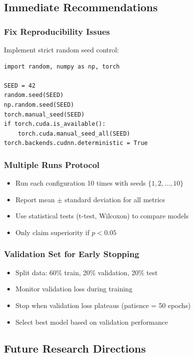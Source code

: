 \documentclass[10pt,a4paper]{article}
\begin{document}
\subsection{Immediate Recommendations}

\subsubsection{Fix Reproducibility Issues}

Implement strict random seed control:

\begin{verbatim}
import random, numpy as np, torch

SEED = 42
random.seed(SEED)
np.random.seed(SEED)
torch.manual_seed(SEED)
if torch.cuda.is_available():
    torch.cuda.manual_seed_all(SEED)
torch.backends.cudnn.deterministic = True
\end{verbatim}

\subsubsection{Multiple Runs Protocol}

\begin{itemize}
\item Run each configuration 10 times with seeds $\{1, 2, \ldots, 10\}$
\item Report mean $\pm$ standard deviation for all metrics
\item Use statistical tests (t-test, Wilcoxon) to compare models
\item Only claim superiority if $p < 0.05$
\end{itemize}

\subsubsection{Validation Set for Early Stopping}

\begin{itemize}
\item Split data: 60\% train, 20\% validation, 20\% test
\item Monitor validation loss during training
\item Stop when validation loss plateaus (patience = 50 epochs)
\item Select best model based on validation performance
\end{itemize}

\subsection{Future Research Directions}
\end{document}
